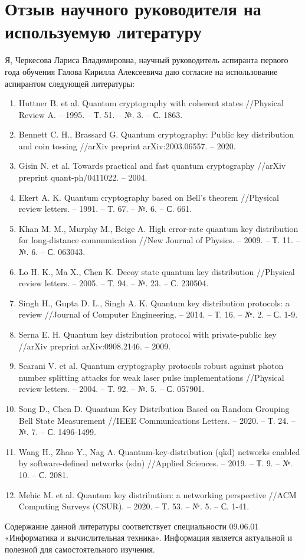 \section*{Отзыв научного руководителя на используемую литературу}
Я, Черкесова Лариса Владимировна, научный руководитель аспиранта первого года обучения Галова Кирилла Алексеевича даю согласие на использование аспирантом следующей литературы:
\begin{enumerate}
	\item Huttner B. et al. Quantum cryptography with coherent states //Physical Review A. – 1995. – Т. 51. – №. 3. – С. 1863.
	\item Bennett C. H., Brassard G. Quantum cryptography: Public key distribution and coin tossing //arXiv preprint arXiv:2003.06557. – 2020.
	\item Gisin N. et al. Towards practical and fast quantum cryptography //arXiv preprint quant-ph/0411022. – 2004.
	\item Ekert A. K. Quantum cryptography based on Bell’s theorem //Physical review letters. – 1991. – Т. 67. – №. 6. – С. 661.
	\item Khan M. M., Murphy M., Beige A. High error-rate quantum key distribution for long-distance communication //New Journal of Physics. – 2009. – Т. 11. – №. 6. – С. 063043.
	\item Lo H. K., Ma X., Chen K. Decoy state quantum key distribution //Physical review letters. – 2005. – Т. 94. – №. 23. – С. 230504.
	\item Singh H., Gupta D. L., Singh A. K. Quantum key distribution protocols: a review //Journal of Computer Engineering. – 2014. – Т. 16. – №. 2. – С. 1-9.
	\item Serna E. H. Quantum key distribution protocol with private-public key //arXiv preprint arXiv:0908.2146. – 2009.
	\item Scarani V. et al. Quantum cryptography protocols robust against photon number splitting attacks for weak laser pulse implementations //Physical review letters. – 2004. – Т. 92. – №. 5. – С. 057901.
	\item Song D., Chen D. Quantum Key Distribution Based on Random Grouping Bell State Measurement //IEEE Communications Letters. – 2020. – Т. 24. – №. 7. – С. 1496-1499.
	\item Wang H., Zhao Y., Nag A. Quantum-key-distribution (qkd) networks enabled by software-defined networks (sdn) //Applied Sciences. – 2019. – Т. 9. – №. 10. – С. 2081.
	\item Mehic M. et al. Quantum key distribution: a networking perspective //ACM Computing Surveys (CSUR). – 2020. – Т. 53. – №. 5. – С. 1-41.
\end{enumerate}
Содержание данной литературы соответствует специальности 09.06.01 «Информатика и вычислительная техника». Информация является актуальной и полезной для самостоятельного изучения.\\
\bigskip





